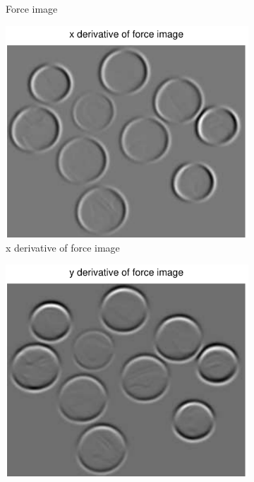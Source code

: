 \documentclass[11pt,a4paper]{article}
\begin{document}
\begin{figure}[H]
\begin{subfigure}[t]{0.21\textwidth}
        \caption{Force image}
        \label{fig:coins_forces}
    \end{subfigure}
    \begin{subfigure}[t]{0.21\textwidth}
        \includegraphics[width=\textwidth]{src/images/coins_gradient_xforces.pdf}
        \caption{x derivative of force image}
        \label{fig:coins_fx}
    \end{subfigure}
    \begin{subfigure}[t]{0.21\textwidth}
        \includegraphics[width=\textwidth]{src/images/coins_gradient_yforces.pdf}

\end{subfigure}
\end{figure}
\end{document}
